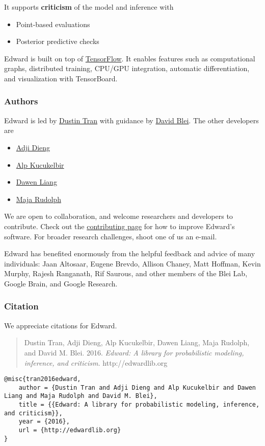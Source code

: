 It supports \textbf{criticism} of the model and inference with
\begin{itemize}
\item Point-based evaluations
\item Posterior predictive checks
\end{itemize}

Edward is built on top of
\href{https://www.tensorflow.org}{TensorFlow}. It enables features such
as computational graphs, distributed training, CPU/GPU integration,
automatic differentiation, and visualization with TensorBoard.

\subsubsection{Authors}

Edward is led by \href{http://dustintran.com}{Dustin Tran} with guidance
by \href{http://www.cs.columbia.edu/~blei/}{David Blei}. The other developers
are
\begin{itemize}
  \item \href{http://stat.columbia.edu/~diengadji/}{Adji Dieng}
  \item \href{http://www.proditus.com/}{Alp Kucukelbir}
  \item \href{http://www.ee.columbia.edu/~dliang/}{Dawen Liang}
  \item \href{http://maja-rita-rudolph.com/}{Maja Rudolph}
\end{itemize}
We are open to collaboration, and welcome
researchers and developers to contribute. Check out the
\href{/contributing}{contributing page} for how to improve Edward's software.
For broader research challenges, shoot one of us an e-mail.

Edward has benefited enormously from the helpful feedback and advice
of many individuals: Jaan Altosaar, Eugene Brevdo, Allison Chaney, Matt
Hoffman, Kevin Murphy, Rajesh Ranganath, Rif Saurous, and other
members of the Blei Lab, Google Brain, and Google Research.

\subsubsection{Citation}

We appreciate citations for Edward.

\begin{quote}
Dustin Tran, Adji Dieng, Alp Kucukelbir, Dawen Liang, Maja Rudolph, and David M.
Blei. 2016.
\emph{Edward: A library for probabilistic modeling, inference, and criticism. }
http://edwardlib.org
\end{quote}

\begin{lstlisting}[class=JSON]
@misc{tran2016edward,
    author = {Dustin Tran and Adji Dieng and Alp Kucukelbir and Dawen Liang and Maja Rudolph and David M. Blei},
    title = {{Edward: A library for probabilistic modeling, inference, and criticism}},
    year = {2016},
    url = {http://edwardlib.org}
}
\end{lstlisting}
